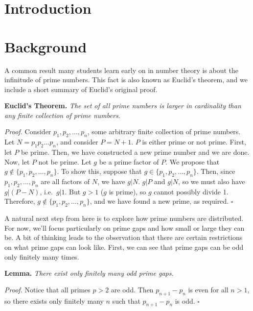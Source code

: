 \documentclass[conference]{IEEEtran}
\begin{document}
\begin{IEEEkeywords}
\end{IEEEkeywords}

\section{Introduction}

\section{Background}

A common result many students learn early on in number theory is about the
infinitude of prime numbers. This fact is also known as Euclid's theorem,
and we include a short summary of Euclid's original proof.

\noindent
\textbf{Euclid's Theorem.} \textit{The set of all prime numbers is larger
in cardinality than any finite collection of prime numbers.}

\noindent
\textit{Proof.} Consider $p_1, p_2, \dots, p_n$, some arbitrary finite
collection of
prime numbers. Let $N = p_1p_2 \dots p_n$, and consider $P = N + 1$. $P$ is
either prime or not prime.
\newline\indent
First, let $P$ be prime. Then, we have constructed a new prime number and
we are done.
\newline\indent
Now, let $P$ not be prime. Let $g$ be a prime factor of $P$. We propose that
$g \notin \{p_1, p_2, \dots, p_n\}$. To show this, suppose that
$g \in \{p_1, p_2, \dots, p_n\}$. Then, since $p_1, p_2, \dots, p_n$ are all
factors of $N$, we have $g | N$. $g | P$ and $g | N$, so
we must also have $g | (P - N)$, i.e.\ $g | 1$. But $g > 1$ ($g$ is prime),
so $g$ cannot possibly divide 1. Therefore,
$g \notin \{p_1, p_2, \dots, p_n\}$, and we have found a new prime, as
required. \hfill$\square$

A natural next step from here is to explore how prime numbers
are distributed. For now, we'll focus particularly on prime
gaps and how small or large they can be. A bit of
thinking leads to the observation that there are certain
restrictions on what prime gaps can look like. First,
we can see that prime gaps can be odd only finitely many
times.

\noindent
\textbf{Lemma.} \textit{There exist only finitely many odd prime
gaps.}

\noindent
\textit{Proof.} Notice that all primes $p > 2$ are odd. Then
$p_{n+1} - p_n$ is even for all $n > 1$, so there exists
only finitely many $n$ such that $p_{n+1} - p_n$ is odd.
\hfill$\square$
\end{document}

